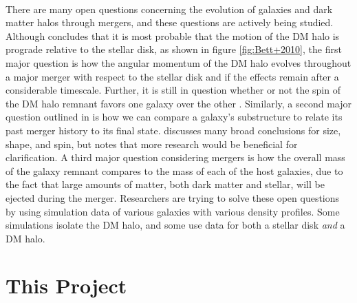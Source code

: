 \documentclass[fleqn,usenatbib]{mnras}
\begin{document}
\paragraph{} There are many open questions concerning the evolution of galaxies and dark matter halos through mergers, and these questions are actively being studied. Although \cite{Bett+2010} concludes that it is most probable that the motion of the DM halo is prograde relative to the stellar disk, as shown in figure \ref{fig:Bett+2010}, the first major question is how the angular momentum of the DM halo evolves throughout a major merger with respect to the stellar disk and if the effects remain after a considerable timescale. Further, it is still in question whether or not the spin of the DM halo remnant favors one galaxy over the other \citep{Rod+2017}. Similarly, a second major question outlined in \cite{Drakos+2019} is how we can compare a galaxy's substructure to relate its past merger history to its final state. \cite{Drakos+2019} discusses many broad conclusions for size, shape, and spin, but notes that more research would be beneficial for clarification. A third major question considering mergers is how the overall mass of the galaxy remnant compares to the mass of each of the host galaxies, due to the fact that large amounts of matter, both dark matter and stellar, will be ejected during the merger. Researchers are trying to solve these open questions by using simulation data of various galaxies with various density profiles. Some simulations isolate the DM halo, and some use data for both a stellar disk \textit{and} a DM halo. 


\section{This Project}
\end{document}
